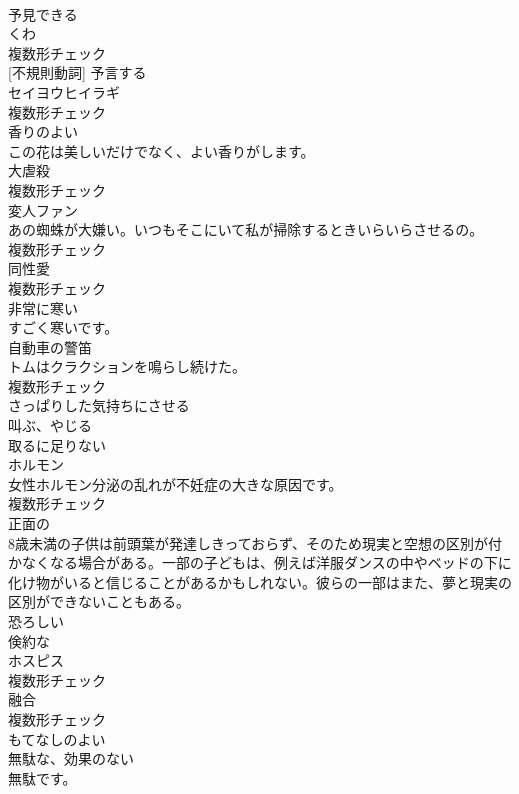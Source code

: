 \documentclass[8pt]{extreport}
\begin{document}
\begin{CJK}{UTF8}{min}
\\	[形容詞]	予見できる	
\\	[名詞]	くわ	
\\	複数形チェック
\\	[動詞] [不規則動詞]	予言する	
\\	[名詞]	セイヨウヒイラギ	
\\	複数形チェック
\\	[形容詞]	香りのよい	
\\	この花は美しいだけでなく、よい香りがします。	
\\	[名詞]	大虐殺	
\\	複数形チェック
\\	[名詞]	変人ファン	
\\	あの蜘蛛が大嫌い。いつもそこにいて私が掃除するときいらいらさせるの。	
\\	複数形チェック
\\	[名詞]	同性愛	
\\	複数形チェック
\\	[形容詞]	非常に寒い	
\\	すごく寒いです。	
\\	[名詞]	自動車の警笛	
\\	トムはクラクションを鳴らし続けた。	
\\	複数形チェック
\\	[動詞]	さっぱりした気持ちにさせる	
\\	[動詞]	叫ぶ、やじる	
\\	[形容詞]	取るに足りない	
\\	[名詞]	ホルモン	
\\	女性ホルモン分泌の乱れが不妊症の大きな原因です。	
\\	複数形チェック
\\	[形容詞]	正面の	
\\	8歳未満の子供は前頭葉が発達しきっておらず、そのため現実と空想の区別が付かなくなる場合がある。一部の子どもは、例えば洋服ダンスの中やベッドの下に化け物がいると信じることがあるかもしれない。彼らの一部はまた、夢と現実の区別ができないこともある。	
\\	[形容詞]	恐ろしい	
\\	[形容詞]	倹約な	
\\	[名詞]	ホスピス	
\\	複数形チェック
\\	[名詞]	融合	
\\	複数形チェック
\\	[形容詞]	もてなしのよい	
\\	[形容詞]	無駄な、効果のない	
\\	無駄です。	

\end{CJK}
\end{document}

